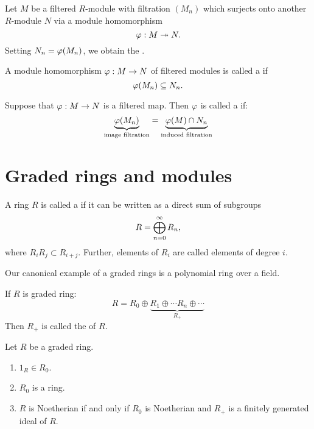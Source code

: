 \documentclass{ximera}
\begin{document}
\begin{definition}
  Let $M$ be a filtered $R$-module with filtration $(M_n)$ which
  surjects onto another $R$-module $N$ via a module homomorphism
  \[
  \varphi:M\twoheadrightarrow N.
  \]
  Setting $N_n = \varphi(M_n)$, we obtain the .
\end{definition}

\begin{definition}
  A module homomorphism $\varphi:M\to N$ of filtered modules is called a
   if
\[
\varphi(M_n)\subseteq N_n.
\]
\end{definition}

\begin{definition}
  Suppose that $\varphi:M\to N$ is a filtered map. Then $\varphi$ is called a
   if:
\[
\underbrace{\varphi(M_n)}_{\text{image filtration}} = \underbrace{\varphi(M)\cap N_n}_{\text{induced filtration}}
\] 
\end{definition}



\section{Graded rings and modules}


\begin{definition}
  A ring $R$ is called a  if it can be written as a
  direct sum of subgroups
  \[
  R=\bigoplus_{n =0}^\infty R_n,
  \]
  where $R_i R_j \subset R_{i+j}$.  Further, elements of $R_i$ are
  called  elements of degree $i$.  
\end{definition}

\begin{remark}
  Our canonical example of a graded rings is a polynomial ring over a
  field.
\end{remark}



\begin{definition}
  If $R$ is graded ring:
  \[
  R = R_0\oplus \underbrace{R_1\oplus \cdots R_n\oplus \cdots}_{R_+}
  \]
  Then $R_+$ is called the  of $R$.
\end{definition}

\begin{exercise}
  Let $R$ be a graded ring.
  \begin{enumerate}
  \item $1_R\in R_0$.
  \item $R_0$ is a ring.
  \item $R$ is Noetherian if and only if $R_0$ is Noetherian and $R_+$
    is a finitely generated ideal of $R$.
  \end{enumerate}
\end{exercise}
\end{document}
